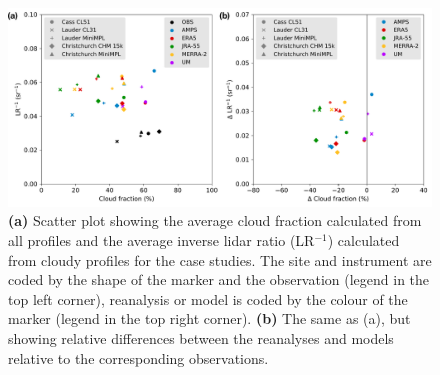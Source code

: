 \clearpage

\begin{figure}[t]
\centering
\includegraphics[width=\textwidth]{chapter3/fig/scatter.pdf}
\caption[Scatter plot showing the average cloud fraction and the average inverse lidar ratio]{
\textbf{(a)} Scatter plot showing the average cloud fraction calculated from all profiles
and the average inverse lidar ratio (LR$^{-1}$) calculated from cloudy profiles
for the case studies. The site and instrument are coded by the shape of the
marker and the observation (legend in the top left corner), reanalysis or model
is coded by the colour of the marker (legend in the top right corner).
\textbf{(b)} The same as (a), but showing relative differences between
the reanalyses and models relative to the corresponding observations.
}
\label{fig:scatter}
\end{figure}

\clearpage

